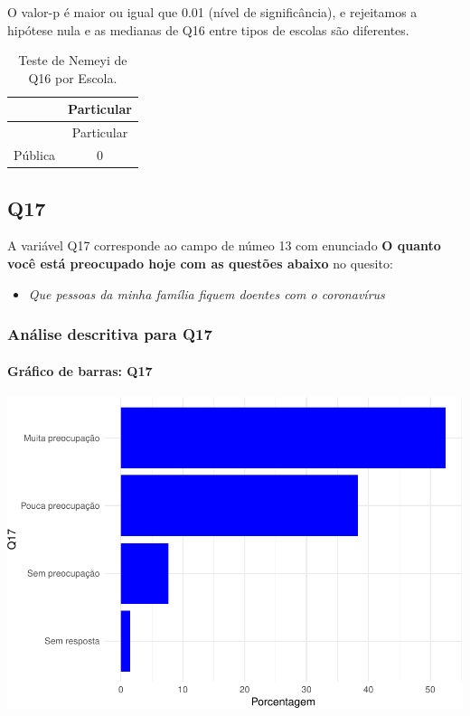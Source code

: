 \documentclass[]{article}
\providecommand{\tightlist}{%
  \setlength{\itemsep}{0pt}\setlength{\parskip}{0pt}}
\let\oldparagraph\paragraph
\renewcommand{\paragraph}[1]{\oldparagraph{#1}\mbox{}}
\begin{document}
O valor-p é maior ou igual que 0.01 (nível de significância), e rejeitamos a hipótese nula e as medianas de Q16 entre tipos de escolas são diferentes.

\begin{longtable}[]{@{}lc@{}}
\caption{\label{tab:unnamed-chunk-180}Teste de Nemeyi de Q16 por Escola.}\tabularnewline
\toprule
& Particular\tabularnewline
\midrule
\endfirsthead
\toprule
& Particular\tabularnewline
\midrule
\endhead
Pública & 0\tabularnewline
\bottomrule
\end{longtable}

\cleardoublepage

\hypertarget{q17}{%
\subsection{Q17}\label{q17}}

A variável Q17 corresponde ao campo de númeo 13 com enunciado \textbf{O quanto você está preocupado hoje com as questões abaixo} no quesito:

\begin{itemize}
\tightlist
\item
  \emph{Que pessoas da minha família fiquem doentes com o coronavírus}
\end{itemize}

\hypertarget{anuxe1lise-descritiva-para-q17}{%
\subsubsection{Análise descritiva para Q17}\label{anuxe1lise-descritiva-para-q17}}

\hypertarget{gruxe1fico-de-barras-q17}{%
\paragraph{Gráfico de barras: Q17}\label{gruxe1fico-de-barras-q17}}

\begin{center}\includegraphics[width=0.75\linewidth]{relatorio_covid19_files/figure-latex/unnamed-chunk-187-1} \end{center}
\end{document}

